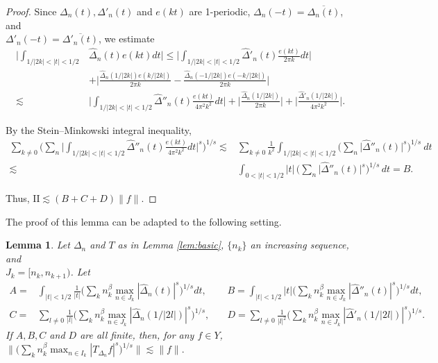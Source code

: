 \documentclass[11pt]{amsart}
\newtheorem{lemma}[thm]{Lemma}
\theoremstyle{definition}
\theoremstyle{remark}
\begin{document}
\begin{proof}
Since $\Delta_n(t), \Delta'_n(t)$ and $e(kt)$ are 1-periodic, $\Delta_n(-t)=\overline{\Delta_n(t)}$, and\\ $\Delta'_n(-t)=\overline{\Delta'_n(t)}$, we estimate
\begin{align}
\Big| \int_{1/|2k| <|t|<1/2} & \hat \Delta_n(t) e(kt) dt \Big| \le  
 \Big|\int_{1/|2k| <|t|<1/2} \hat \Delta'_n(t) \frac{e(kt)}{2\pi k} dt \Big| \nonumber \\
& + \Big|\frac{\hat \Delta_n(1/|2k| ) e(k/|2k| )}{2\pi k} - \frac{\hat \Delta_n(-1/|2k| ) e(-k/|2k| )}{2\pi k} \Big| \label{eq:1stderivative}\\   %
\lesssim &  \Big| \int_{1/|2k| <|t|<1/2} \hat \Delta''_n(t) \frac{e(kt)}{4\pi^2 k^2} dt \Big| %
  + \Big| \frac{\hat \Delta_n(1/|2k| ) }{2\pi k} \Big| 
  +  \Big| \frac{\hat \Delta'_n(1/|2k| )}{4\pi^2 k^2}\Big|. 
 \nonumber
 \end{align}

By the Stein--Minkowski integral inequality,
\begin{align*}
\sum_{k\neq 0}   \Big( \sum_n  \Big |  \int_{1/|2k|<|t|<1/2} \hat \Delta''_n(t) \frac{e(kt)}{4\pi^2 k^2}  dt \Big |^s \Big)^{1/s} 
\lesssim  & \sum_{k\neq 0} \frac 1{k^2}  \int_{1/|2k|<|t|<1/2} \Big( \sum_n  \Big | \hat \Delta''_n(t) \Big |^s \Big)^{1/s} \ dt  \\
\lesssim & \int_{0<|t|<1/2}  |t| \,  \Big( \sum_n  \Big | \hat \Delta''_n(t) \Big |^s \Big)^{1/s}\, dt  = B .
\end{align*}

Thus, $\mbox{II}\lesssim (B+C+D) \lVert f\rVert$.

\end{proof}

The proof of this lemma can be adapted to the following setting.


\begin{lemma}\label{lem:basic2} 
Let $\Delta_n$ and $T$ as in Lemma \ref{lem:basic}, $\{n_k\}$ an increasing sequence, and \\$J_k=[n_k,n_{k+1})$.
Let
\begin{align*}
A= & \int_{|t|<1/2} \frac 1{|t|}        \Big( \sum_k n_k^{\beta} \max_{n\in J_k} |\hat \Delta_{n}(t)|^s \Big)^{1/s} dt,  \quad
& B=  \int_{|t|<1/2} |t|     \Big( \sum_k n_k^{\beta} \max_{n\in J_k} |\hat \Delta''_{n}(t)|^s \Big)^{1/s} dt, \\
C=&\sum_{l\neq 0} \frac 1{|l|}       \Big( \sum_k n_k^{\beta} \max_{n\in J_k} |\hat \Delta_{n}(1/|2l|)|^s \Big)^{1/s},  \quad
& D= \sum_{l\neq 0} \frac 1{|l|^2}       \Big( \sum_k n_k^{\beta} \max_{n\in J_k} |\hat \Delta'_{n}(1/|2l|)|^s \Big)^{1/s}. 
\end{align*}
If $A, B, C$ and  $D$ are all finite, then, for any $f\in Y$,
$ \Big\lVert    \Big( \sum_k n_k^{\beta} \max_{n\in I_k} |T_{\Delta_{n}}f|^s \Big)^{1/s} \Big\rVert \lesssim  \lVert f \rVert.$
\end{lemma}
\end{document}

